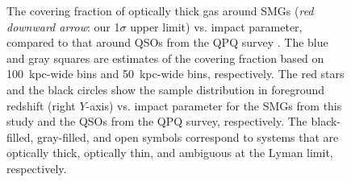 \documentclass[iop,revtex4,twocolumn,apj,numberedappendix,appendixfloats]{emulateapj}
\begin{document}
\begin{figure}[!tb]
\caption{The covering fraction of optically thick gas around SMGs ({\it red downward arrow}: our 1$\sigma$ upper limit) vs. impact parameter, compared to that around QSOs from the QPQ survey \citep[{\it blue/gray squares} with error bars;][]{Prochaska13}. The blue and gray squares are estimates of the covering fraction based on 100~kpc-wide bins and 50~kpc-wide bins, respectively. The red stars and the black circles show the sample distribution in foreground redshift (right $Y$-axis) vs. impact parameter for the SMGs from this study and the QSOs from the QPQ survey, respectively. The black-filled, gray-filled, and open symbols correspond to systems that are optically thick, optically thin, and ambiguous at the Lyman limit, respectively.   
\label{fig:covfrac}} 
\end{figure}


\acknowledgments
\end{document}
